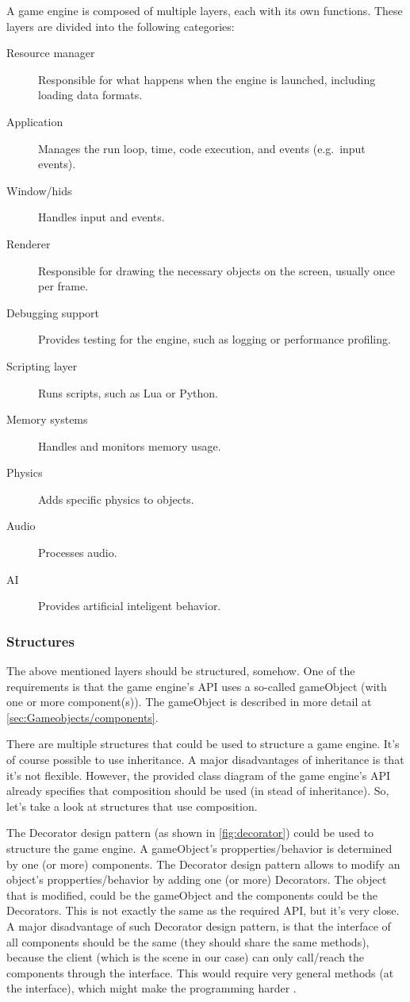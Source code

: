 \documentclass{projdoc}
\begin{document}
A game engine is composed of multiple layers, each with its own functions. These
layers are divided into the following categories:\noparbreak
\begin{description}
	\item[Resource manager] Responsible for what happens when the engine is launched,
		including loading data formats.
	\item[Application] Manages the run loop, time, code execution, and events
		(e.g.~input events).
	\item[Window/\glspl{hid}] Handles input and events.
	\item[Renderer] Responsible for drawing the necessary objects on the screen,
		usually once per frame.
	\item[Debugging support] Provides testing for the engine, such as logging or
		performance profiling.
	\item[Scripting layer] Runs scripts, such as Lua or Python.
	\item[Memory systems] Handles and monitors memory usage.
	\item[Physics] Adds specific physics to objects.
	\item[Audio] Processes audio.
	\item[AI] Provides artificial inteligent behavior.
\end{description}

\subsubsection{Structures}

The above mentioned layers should be structured, somehow. One of the requirements is
that the game engine's API uses a so-called gameObject (with one or more
component(s)). The gameObject is described in more detail at
\cref{sec:Gameobjects/components}.

There are multiple structures that could be used to structure a game engine. It's of
course possible to use inheritance. A major disadvantages of inheritance is that it's
not flexible. However, the provided class diagram of the game engine's API already
specifies that composition should be used (in stead of inheritance). So, let's take a
look at structures that use composition.

The Decorator design pattern (as shown in \cref{fig:decorator}) could be used to
structure the game engine. A gameObject's propperties/behavior is determined by one
(or more) components. The Decorator design pattern allows to modify an object's
propperties/behavior by adding one (or more) Decorators. The object that is modified,
could be the gameObject and the components could be the Decorators. This is not
exactly the same as the required API, but it's very close. A major disadvantage of
such Decorator design pattern, is that the interface of all components should be the
same (they should share the same methods), because the client (which is the scene in
our case) can only call/reach the components through the interface. This would
require very general methods (at the interface), which might make the programming
harder \autocite{man:DecoratorDesignPattern}.
\end{document}
